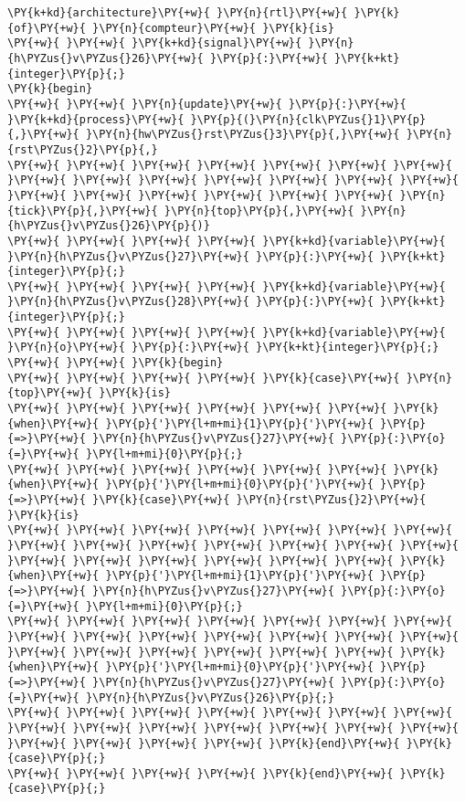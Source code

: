 \begin{Verbatim}[commandchars=\\\{\}]
\PY{k+kd}{architecture}\PY{+w}{ }\PY{n}{rtl}\PY{+w}{ }\PY{k}{of}\PY{+w}{ }\PY{n}{compteur}\PY{+w}{ }\PY{k}{is}
\PY{+w}{ }\PY{+w}{ }\PY{k+kd}{signal}\PY{+w}{ }\PY{n}{h\PYZus{}v\PYZus{}26}\PY{+w}{ }\PY{p}{:}\PY{+w}{ }\PY{k+kt}{integer}\PY{p}{;}
\PY{k}{begin}
\PY{+w}{ }\PY{+w}{ }\PY{n}{update}\PY{+w}{ }\PY{p}{:}\PY{+w}{ }\PY{k+kd}{process}\PY{+w}{ }\PY{p}{(}\PY{n}{clk\PYZus{}1}\PY{p}{,}\PY{+w}{ }\PY{n}{hw\PYZus{}rst\PYZus{}3}\PY{p}{,}\PY{+w}{ }\PY{n}{rst\PYZus{}2}\PY{p}{,}
\PY{+w}{ }\PY{+w}{ }\PY{+w}{ }\PY{+w}{ }\PY{+w}{ }\PY{+w}{ }\PY{+w}{ }\PY{+w}{ }\PY{+w}{ }\PY{+w}{ }\PY{+w}{ }\PY{+w}{ }\PY{+w}{ }\PY{+w}{ }\PY{+w}{ }\PY{+w}{ }\PY{+w}{ }\PY{+w}{ }\PY{+w}{ }\PY{+w}{ }\PY{n}{tick}\PY{p}{,}\PY{+w}{ }\PY{n}{top}\PY{p}{,}\PY{+w}{ }\PY{n}{h\PYZus{}v\PYZus{}26}\PY{p}{)}
\PY{+w}{ }\PY{+w}{ }\PY{+w}{ }\PY{+w}{ }\PY{k+kd}{variable}\PY{+w}{ }\PY{n}{h\PYZus{}v\PYZus{}27}\PY{+w}{ }\PY{p}{:}\PY{+w}{ }\PY{k+kt}{integer}\PY{p}{;}
\PY{+w}{ }\PY{+w}{ }\PY{+w}{ }\PY{+w}{ }\PY{k+kd}{variable}\PY{+w}{ }\PY{n}{h\PYZus{}v\PYZus{}28}\PY{+w}{ }\PY{p}{:}\PY{+w}{ }\PY{k+kt}{integer}\PY{p}{;}
\PY{+w}{ }\PY{+w}{ }\PY{+w}{ }\PY{+w}{ }\PY{k+kd}{variable}\PY{+w}{ }\PY{n}{o}\PY{+w}{ }\PY{p}{:}\PY{+w}{ }\PY{k+kt}{integer}\PY{p}{;}
\PY{+w}{ }\PY{+w}{ }\PY{k}{begin}
\PY{+w}{ }\PY{+w}{ }\PY{+w}{ }\PY{+w}{ }\PY{k}{case}\PY{+w}{ }\PY{n}{top}\PY{+w}{ }\PY{k}{is}
\PY{+w}{ }\PY{+w}{ }\PY{+w}{ }\PY{+w}{ }\PY{+w}{ }\PY{+w}{ }\PY{k}{when}\PY{+w}{ }\PY{p}{'}\PY{l+m+mi}{1}\PY{p}{'}\PY{+w}{ }\PY{p}{=>}\PY{+w}{ }\PY{n}{h\PYZus{}v\PYZus{}27}\PY{+w}{ }\PY{p}{:}\PY{o}{=}\PY{+w}{ }\PY{l+m+mi}{0}\PY{p}{;}
\PY{+w}{ }\PY{+w}{ }\PY{+w}{ }\PY{+w}{ }\PY{+w}{ }\PY{+w}{ }\PY{k}{when}\PY{+w}{ }\PY{p}{'}\PY{l+m+mi}{0}\PY{p}{'}\PY{+w}{ }\PY{p}{=>}\PY{+w}{ }\PY{k}{case}\PY{+w}{ }\PY{n}{rst\PYZus{}2}\PY{+w}{ }\PY{k}{is}
\PY{+w}{ }\PY{+w}{ }\PY{+w}{ }\PY{+w}{ }\PY{+w}{ }\PY{+w}{ }\PY{+w}{ }\PY{+w}{ }\PY{+w}{ }\PY{+w}{ }\PY{+w}{ }\PY{+w}{ }\PY{+w}{ }\PY{+w}{ }\PY{+w}{ }\PY{+w}{ }\PY{+w}{ }\PY{+w}{ }\PY{+w}{ }\PY{+w}{ }\PY{k}{when}\PY{+w}{ }\PY{p}{'}\PY{l+m+mi}{1}\PY{p}{'}\PY{+w}{ }\PY{p}{=>}\PY{+w}{ }\PY{n}{h\PYZus{}v\PYZus{}27}\PY{+w}{ }\PY{p}{:}\PY{o}{=}\PY{+w}{ }\PY{l+m+mi}{0}\PY{p}{;}
\PY{+w}{ }\PY{+w}{ }\PY{+w}{ }\PY{+w}{ }\PY{+w}{ }\PY{+w}{ }\PY{+w}{ }\PY{+w}{ }\PY{+w}{ }\PY{+w}{ }\PY{+w}{ }\PY{+w}{ }\PY{+w}{ }\PY{+w}{ }\PY{+w}{ }\PY{+w}{ }\PY{+w}{ }\PY{+w}{ }\PY{+w}{ }\PY{+w}{ }\PY{k}{when}\PY{+w}{ }\PY{p}{'}\PY{l+m+mi}{0}\PY{p}{'}\PY{+w}{ }\PY{p}{=>}\PY{+w}{ }\PY{n}{h\PYZus{}v\PYZus{}27}\PY{+w}{ }\PY{p}{:}\PY{o}{=}\PY{+w}{ }\PY{n}{h\PYZus{}v\PYZus{}26}\PY{p}{;}
\PY{+w}{ }\PY{+w}{ }\PY{+w}{ }\PY{+w}{ }\PY{+w}{ }\PY{+w}{ }\PY{+w}{ }\PY{+w}{ }\PY{+w}{ }\PY{+w}{ }\PY{+w}{ }\PY{+w}{ }\PY{+w}{ }\PY{+w}{ }\PY{+w}{ }\PY{+w}{ }\PY{+w}{ }\PY{+w}{ }\PY{k}{end}\PY{+w}{ }\PY{k}{case}\PY{p}{;}
\PY{+w}{ }\PY{+w}{ }\PY{+w}{ }\PY{+w}{ }\PY{k}{end}\PY{+w}{ }\PY{k}{case}\PY{p}{;}
\end{Verbatim}
